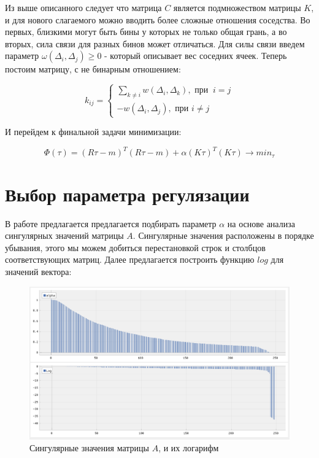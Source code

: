 \documentclass[a4paper,12pt]{diplom}
\renewcommand{\geq}{\geqslant}
\begin{document}
Из выше описанного следует что матрица $C$ является подмножеством матрицы $K$, и для нового слагаемого можно вводить более сложные
отношения соседства. Во первых, близкими могут быть бины у которых не только общая грань, а во вторых, сила связи для разных бинов
может отличаться. Для силы связи введем параметр $\omega(\Delta_{i}, \Delta_{j}) \geq 0$ - который описывает вес соседних ячеек. 
Теперь постоим матрицу, с не бинарным отношением:

\begin{equation}
 k_{ij} =
  \begin{cases}
    \displaystyle\sum_{k\neq i} w(\Delta_{i}, \Delta_{k}), \text{ при } \ i = j \\
    -w( \Delta_{i}, \Delta_{j} ), \text{ при } i \neq j
  \end{cases}
\end{equation}

И перейдем к финальной задачи минимизации:

\begin{equation}
   \Phi(\tau)=(R\tau-m)^T (R\tau-m) + \alpha(K\tau)^T(K\tau) \to min_{\tau}
   \label{min_n_dim}
\end{equation}
  

\section{Выбор параметра регулязации}

В работе \cite{SvdHocker} предлагается предлагается подбирать параметр $\alpha$ на основе анализа сингулярных значений матрицы $A$. Сингулярные 
значения расположены в порядке убывания, этого мы можем добиться перестановкой строк и столбцов соответствующих матриц. Далее предлагается построить 
функцию $log$ для значений вектора:

\clearpage
\begin{figure}[h]
   \includegraphics[width=\linewidth]{images/alpha.png}
   \caption{ Сингулярные значения матрицы $A$, и их логарифм }
   \label{photo:alpha}
\end{figure}
\end{document}
